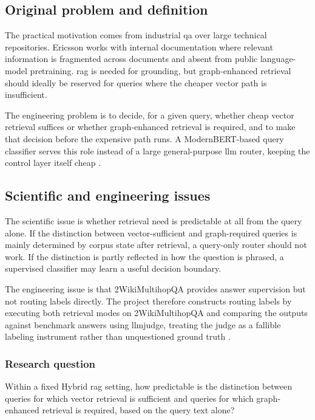 \documentclass[english, bibtex]{kththesis}               %
\numberwithin{listing}{chapter}
\begin{document}
\subsection{Original problem and definition}
\label{sec:researchQuestion}

The practical motivation comes from industrial \gls{qa} over large technical repositories. Ericsson works with internal documentation where relevant information is fragmented across documents and absent from public language-model pretraining. \Gls{rag} is needed for grounding, but graph-enhanced retrieval should ideally be reserved for queries where the cheaper vector path is insufficient.

The engineering problem is to decide, for a given query, whether cheap vector retrieval suffices or whether graph-enhanced retrieval is required, and to make that decision before the expensive path runs. A ModernBERT-based query classifier serves this role instead of a large general-purpose \gls{llm} router, keeping the control layer itself cheap \cite{benayas2024encoder,warner2024modernbert}.

\subsection{Scientific and engineering issues}
\label{sec:scientificEngineeringIssues}

The scientific issue is whether retrieval need is predictable at all from the query alone. If the distinction between vector-sufficient and graph-required queries is mainly determined by corpus state after retrieval, a query-only router should not work. If the distinction is partly reflected in how the question is phrased, a supervised classifier may learn a useful decision boundary.

The engineering issue is that 2WikiMultihopQA provides answer supervision but not routing labels directly. The project therefore constructs routing labels by executing both retrieval modes on 2WikiMultihopQA and comparing the outputs against benchmark answers using \gls{llmjudge}, treating the judge as a fallible labeling instrument rather than unquestioned ground truth \cite{ho2020twowiki,zheng2023judge}.

\subsubsection{Research question}

Within a fixed Hybrid \gls{rag} setting, how predictable is the distinction between queries for which vector retrieval is sufficient and queries for which graph-enhanced retrieval is required, based on the query text alone?
\end{document}
